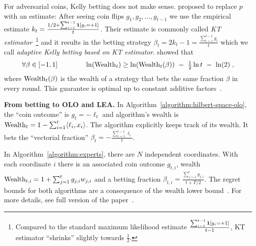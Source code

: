For adversarial coins, Kelly betting does not make sense.
\citet{Krichevsky-Trofimov-1981} proposed to replace $p$ with an estimate:
After seeing coin flips
$g_1, g_2, \dots, g_{t-1}$ we use the empirical estimate $k_t = \frac{1/2 +
\sum_{i=1}^{t-1} \mathbf{1}[g_i = +1]}{t}$. Their
estimate is commonly called \emph{KT estimator}~\footnote{Compared to the
standard maximum likelihood estimate $\frac{\sum_{i=1}^{t-1} \mathbf{1}[g_i =
+1]}{t-1}$, KT estimator ``shrinks'' slightly towards $\frac{1}{2}$.}
and it results in the betting strategy
$
\beta_t = 2k_t - 1 = \tfrac{\sum_{i=1}^{t-1} g_i}{t}
$
which we call \emph{adaptive Kelly betting based on KT estimator}.
\citeauthor{Krichevsky-Trofimov-1981} showed that
\begin{equation}
\label{equation:wealth-lower-bound}
\forall \beta \in [-1,1] \qquad \qquad \ln(\operatorname{Wealth}_t) \ge \ln(\operatorname{Wealth}_t(\beta)) \ - \ \tfrac{1}{2} \ln t \ - \ \ln(2) \; ,
\end{equation}
where $\operatorname{Wealth}_t(\beta)$ is the wealth of a strategy that bets the same
fraction $\beta$ in every round. This guarantee is optimal up to constant
additive factors~\citep{Cesa-Bianchi-Lugosi-2006}.

\textbf{From betting to \ac{OLO} and \ac{LEA}.}
In Algorithm~\ref{algorithm:hilbert-space-olo}, the ``coin outcome'' is
$g_t = -\ell_t$ and algorithm's wealth is
$
\operatorname{Wealth}_t = 1 - \sum_{i=1}^t \langle \ell_i, x_i \rangle
$.
The algorithm explicitly keeps track of its wealth. It bets the ``vectorial fraction''
$
\beta_t = - \tfrac{\sum_{i=1}^{t-1} \ell_i}{t}
$.

In Algorithm~\ref{algorithm:experts}, there are $N$ independent coordinates.
With each coordinate $i$ there is an associated coin outcome $g_{t,i}$, wealth
$
\operatorname{Wealth}_{t,i} = 1 + \sum_{j=1}^t g_{j,i} w_{j,i}
$
and a betting fraction
$
\beta_{t,i} = \tfrac{\sum_{j=1}^t g_{j,i}}{t + T/2}
$.
The regret bounds for both algorithms are a consequence of the wealth lower
bound~\label{equation:wealth-lower-bound}.  For more details, see full version
of the paper~\citep{Orabona-Pal-2016-parameter-free}.
